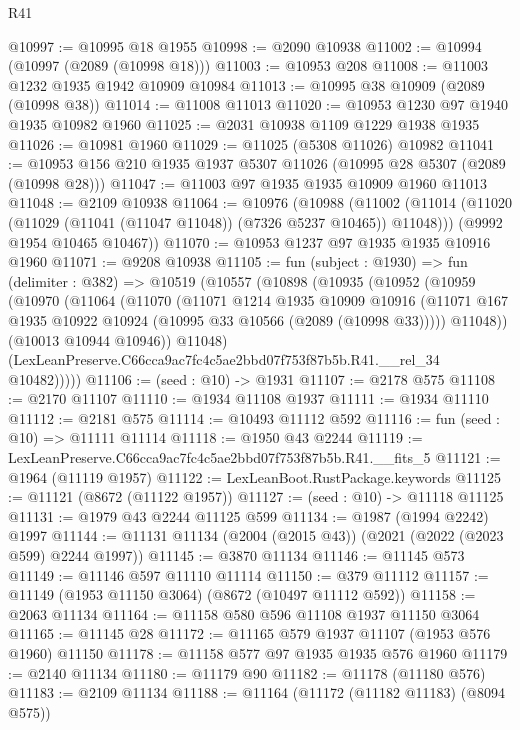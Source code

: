 \begin{lexlean}{R41}
\begin{coremodule}
@10997 := @10995 @18 @1955
@10998 := @2090 @10938
@11002 := @10994 (@10997 (@2089 (@10998 @18)))
@11003 := @10953 @208
@11008 := @11003 @1232 @1935 @1942 @10909 @10984
@11013 := @10995 @38 @10909 (@2089 (@10998 @38))
@11014 := @11008 @11013
@11020 := @10953 @1230 @97 @1940 @1935 @10982 @1960
@11025 := @2031 @10938 @1109 @1229 @1938 @1935
@11026 := @10981 @1960
@11029 := @11025 (@5308 @11026) @10982
@11041 := @10953 @156 @210 @1935 @1937 @5307 @11026 (@10995 @28 @5307 (@2089 (@10998 @28)))
@11047 := @11003 @97 @1935 @1935 @10909 @1960 @11013
@11048 := @2109 @10938
@11064 := @10976
    (@10988
      (@11002 (@11014 (@11020 (@11029 (@11041 (@11047 @11048)) (@7326 @5237 @10465)) @11048)))
      (@9992 @1954 @10465 @10467))
@11070 := @10953 @1237 @97 @1935 @1935 @10916 @1960
@11071 := @9208 @10938
@11105 := fun (subject : @1930) =>
  fun (delimiter : @382) =>
  @10519
    (@10557
      (@10898
        (@10935
          (@10952
            (@10959
              (@10970
                (@11064
                  (@11070
                    (@11071
                      @1214
                      @1935
                      @10909
                      @10916
                      (@11071 @167 @1935 @10922 @10924 (@10995 @33 @10566 (@2089 (@10998 @33)))))
                    @11048))
                (@10013 @10944 @10946))
              @11048)
            (LexLeanPreserve.C66cca9ac7fc4c5ae2bbd07f753f87b5b.R41.__rel_34 @10482)))))
@11106 := (seed : @10) -> @1931
@11107 := @2178 @575
@11108 := @2170 @11107
@11110 := @1934 @11108 @1937
@11111 := @1934 @11110
@11112 := @2181 @575
@11114 := @10493 @11112 @592
@11116 := fun (seed : @10) => @11111 @11114
@11118 := @1950 @43 @2244
@11119 := LexLeanPreserve.C66cca9ac7fc4c5ae2bbd07f753f87b5b.R41.__fits_5
@11121 := @1964 (@11119 @1957)
@11122 := LexLeanBoot.RustPackage.keywords
@11125 := @11121 (@8672 (@11122 @1957))
@11127 := (seed : @10) -> @11118 @11125
@11131 := @1979 @43 @2244 @11125 @599
@11134 := @1987 (@1994 @2242) @1997
@11144 := @11131 @11134 (@2004 (@2015 @43)) (@2021 (@2022 (@2023 @599) @2244 @1997))
@11145 := @3870 @11134
@11146 := @11145 @573
@11149 := @11146 @597 @11110 @11114
@11150 := @379 @11112
@11157 := @11149 (@1953 @11150 @3064) (@8672 (@10497 @11112 @592))
@11158 := @2063 @11134
@11164 := @11158 @580 @596 @11108 @1937 @11150 @3064
@11165 := @11145 @28
@11172 := @11165 @579 @1937 @11107 (@1953 @576 @1960) @11150
@11178 := @11158 @577 @97 @1935 @1935 @576 @1960
@11179 := @2140 @11134
@11180 := @11179 @90
@11182 := @11178 (@11180 @576)
@11183 := @2109 @11134
@11188 := @11164 (@11172 (@11182 @11183) (@8094 @575))

\end{coremodule}
\end{lexlean}
